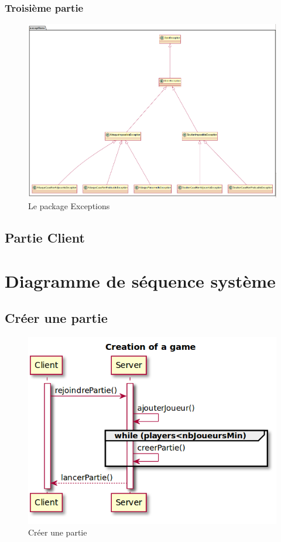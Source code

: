 		\subsubsection{Troisième partie}
			\vspace{10mm}
			\begin{figure}[H]
				\centering
				\includegraphics[scale=0.4]{images/DP3.png}
				\caption{Le package Exceptions}
			\end{figure}

	\subsection{Partie Client}

\section{Diagramme de séquence système}
	\subsection{Créer une partie}
		\vspace{10mm}
		\begin{figure}[H]
			\centering
			\includegraphics[scale=0.5]{images/DSSCreate.png}
			\caption{Créer une partie}
		\end{figure}

